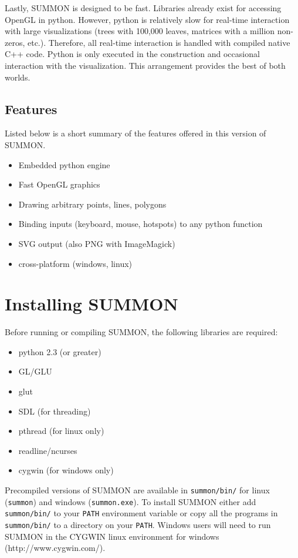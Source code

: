 \documentclass[12pt]{article}
\newcommand{\items}[1]{\begin{itemize} #1 \end{itemize}}
\newcommand{\code}[1]{{\tt #1}}
\begin{document}
Lastly, SUMMON is designed to be fast.  Libraries already exist for
accessing OpenGL in python.  However, python is relatively slow for real-time
interaction with large visualizations (trees with 100,000 leaves, matrices with
a million non-zeros, etc.).  Therefore, all real-time interaction is handled
with compiled native C++ code.  Python is only executed in the construction 
and occasional interaction with the visualization.  This arrangement provides 
the best of both worlds.




\subsection{Features}

Listed below is a short summary of the features offered in this version of
SUMMON.

\items{
    \item Embedded python engine
    \item Fast OpenGL graphics    
    \item Drawing arbitrary points, lines, polygons
    \item Binding inputs (keyboard, mouse, hotspots) to any python function 
    \item SVG output (also PNG with ImageMagick)
    \item cross-platform (windows, linux)
}

\section{Installing SUMMON}
\label{sec:installing}

Before running or compiling SUMMON, the following libraries are required:
\items {
    \item python 2.3 (or greater)
    \item GL/GLU    
    \item glut 
    \item SDL (for threading)
    \item pthread (for linux only)
    \item readline/ncurses
    \item cygwin (for windows only)
}

Precompiled versions of SUMMON are available in \code{summon/bin/} for linux
(\code{summon}) and windows (\code{summon.exe}).  To install SUMMON either add
\code{summon/bin/} to your \code{PATH} environment variable or copy all the
programs in \code{summon/bin/} to a directory on your \code{PATH}.  Windows users
will need to run SUMMON in the CYGWIN linux environment for windows 
(http://www.cygwin.com/).
\end{document}
